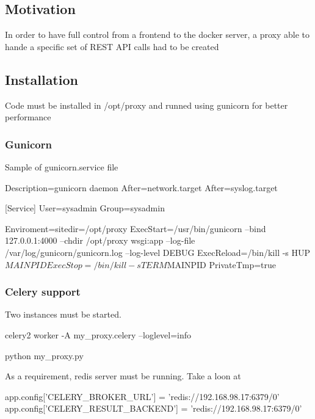\subsection*{Motivation}

In order to have full control from a frontend to the docker server, a proxy able to hande a specific set of R\+E\+ST A\+PI calls had to be created

\subsection*{Installation}

Code must be installed in /opt/proxy and runned using gunicorn for better performance

\subsubsection*{Gunicorn}

Sample of gunicorn.\+service file


\begin{DoxyCode}
[Unit]
Description=gunicorn daemon
After=network.target
After=syslog.target

[Service]
User=sysadmin
Group=sysadmin

Enviroment=sitedir=/opt/proxy
ExecStart=/usr/bin/gunicorn --bind 127.0.0.1:4000 --chdir /opt/proxy  wsgi:app --log-file
       /var/log/gunicorn/gunicorn.log --log-level DEBUG
ExecReload=/bin/kill -s HUP $MAINPID
ExecStop=/bin/kill -s TERM $MAINPID
PrivateTmp=true
\end{DoxyCode}
 \subsubsection*{Celery support}

Two instances must be started.


\begin{DoxyCode}
celery2 worker -A my\_proxy.celery --loglevel=info
\end{DoxyCode}



\begin{DoxyCode}
python my\_proxy.py
\end{DoxyCode}


As a requirement, redis server must be running. Take a loon at


\begin{DoxyCode}
app.config['CELERY\_BROKER\_URL'] = 'redis://192.168.98.17:6379/0'
app.config['CELERY\_RESULT\_BACKEND'] = 'redis://192.168.98.17:6379/0'
\end{DoxyCode}


